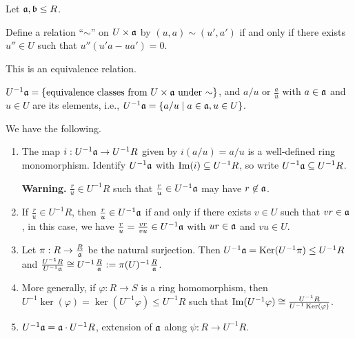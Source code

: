 \noindent Let $\mathfrak{a},\mathfrak{b} \leq R$.

\begin{definition}\label{3.8}
    Define a relation ``$\sim$'' on $U \times \mathfrak{a}$ by $(u,a) \sim (u',a')$ if and only if there exists $u'' \in U$ such that $u''(u'a - ua') = 0$.
\end{definition}

\begin{fact}\label{3.9}
    This is an equivalence relation.
\end{fact}

\begin{notation}\label{3.10}
    $U^{-1}\mathfrak{a} = \{\text{equivalence classes from $U \times \mathfrak{a}$ under $\sim$}\}$, and $a/u$ or $\frac{a}{u}$ with $a \in \mathfrak{a}$ and $u \in U$ are its elements, i.e., $U^{-1}\mathfrak{a} = \{a/u \mid a \in \mathfrak{a}, u \in U\}$.
\end{notation}

\begin{proposition}\label{3.11}
    We have the following.
    \begin{enumerate}
        \item\label{3.11a} The map $i: U^{-1}\mathfrak{a} \to U^{-1}R$ given by $i(a/u) = a/u$ is a well-defined ring monomorphism. Identify $U^{-1}\mathfrak{a}$ with $\operatorname{Im}(i) \subseteq U^{-1}R$, so write $U^{-1}\mathfrak{a} \subseteq U^{-1}R$. \par 
            \textbf{Warning.} $\frac{r}{u} \in U^{-1}R$ such that $\frac{r}{u} \in U^{-1}\mathfrak{a}$ may have $r \not \in \mathfrak{a}$.
        \item\label{3.11b} If $\frac{r}{u} \in U^{-1}R$, then $\frac{r}{u} \in U^{-1}\mathfrak{a}$ if and only if there exists $v \in U$ such that $vr \in \mathfrak{a}$, in this case, we have $\frac{r}{u} = \frac{vr}{vu} \in U^{-1}\mathfrak{a}$ with $ur \in \mathfrak{a}$ and $vu \in U$.
        \item\label{3.11c} Let $\pi: R \to \frac{R}{\mathfrak{a}}$ be the natural surjection. Then $U^{-1}\mathfrak{a} = \operatorname{Ker}(U^{-1} \pi) \leq U^{-1}R$ and $\frac{U^{-1}R}{U^{-1}\mathfrak{a}} \cong U^{-1}\frac{R}{\mathfrak{a}} := \pi(U)^{-1} \frac{R}{\mathfrak{a}}$.
        \item\label{3.11d} More generally, if $\varphi: R \to S$ is a ring homomorphism, then $U^{-1} \ker(\varphi) = \ker(U^{-1}\varphi) \leq U^{-1}R$ such that $\operatorname{Im}(U^{-1}\varphi) \cong \frac{U^{-1}R}{U^{-1}\operatorname{Ker}(\varphi)}$.
        \item\label{3.11e} $U^{-1}\mathfrak{a} = \mathfrak{a} \cdot U^{-1}R$, extension of $\mathfrak{a}$ along $\psi: R \to U^{-1}R$.
    \end{enumerate}
\end{proposition}

